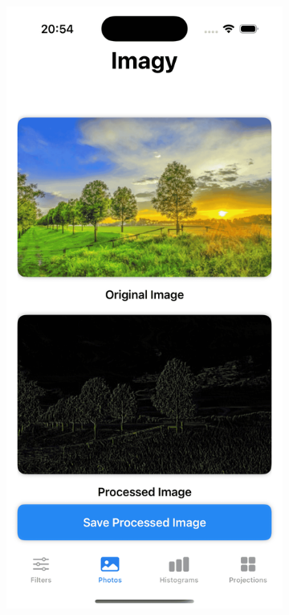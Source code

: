 \documentclass[a4paper]{article}
\begin{document}
\begin{figure}[H]
\begin{subfigure}{0.2\textwidth}
        \label{fig:barn_robert_cross}
    \end{subfigure}
    \hfill
    \begin{subfigure}{0.2\textwidth}
        \centering
        \includegraphics[width=\linewidth]{images/trees_robert_cross.png}

\end{subfigure}
\end{figure}
\end{document}
